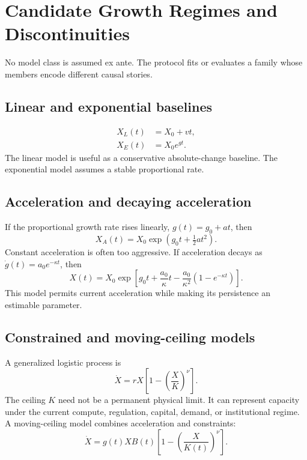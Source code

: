 
\section{Candidate Growth Regimes and Discontinuities}

No model class is assumed ex ante. The protocol fits or evaluates a family whose members encode different causal stories.

\subsection{Linear and exponential baselines}

\begin{align}
X_L(t)&=X_0+vt,\\
X_E(t)&=X_0e^{gt}.
\end{align}
The linear model is useful as a conservative absolute-change baseline. The exponential model assumes a stable proportional rate.

\subsection{Acceleration and decaying acceleration}

If the proportional growth rate rises linearly, $g(t)=g_0+at$, then
\begin{equation}
\label{eq:accelerating}
X_A(t)=X_0\exp\left(g_0t+\tfrac12at^2\right).
\end{equation}
Constant acceleration is often too aggressive. If acceleration decays as $\dot g(t)=a_0e^{-\kappa t}$, then
\begin{equation}
\label{eq:decay-acc}
X(t)=X_0\exp\left[g_0t+\frac{a_0}{\kappa}t-\frac{a_0}{\kappa^2}\left(1-e^{-\kappa t}\right)\right].
\end{equation}
This model permits current acceleration while making its persistence an estimable parameter.

\subsection{Constrained and moving-ceiling models}

A generalized logistic process is
\begin{equation}
\dot X=rX\left[1-\left(\frac{X}{K}\right)^\nu\right].
\end{equation}
The ceiling $K$ need not be a permanent physical limit. It can represent capacity under the current compute, regulation, capital, demand, or institutional regime. A moving-ceiling model combines acceleration and constraints:
\begin{equation}
\label{eq:moving-ceiling}
\dot X=g(t)X B(t)\left[1-\left(\frac{X}{K(t)}\right)^\nu\right].
\end{equation}

